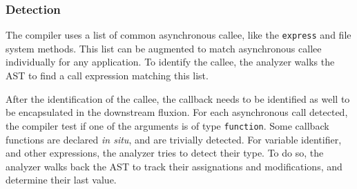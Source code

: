 
\subsubsection{Detection}

The compiler uses a list of common asynchronous callee, like the \texttt{express} and file system methods.
This list can be augmented to match asynchronous callee individually for any application.
To identify the callee, the analyzer walks the AST to find a call expression matching this list.


After the identification of the callee, the callback needs to be identified as well to be encapsulated in the downstream fluxion.
For each asynchronous call detected, the compiler test if one of the arguments is of type \texttt{function}.
Some callback functions are declared \textit{in situ}, and are trivially detected.
For variable identifier, and other expressions, the analyzer tries to detect their type.
To do so, the analyzer walks back the AST to track their assignations and modifications, and determine their last value.

